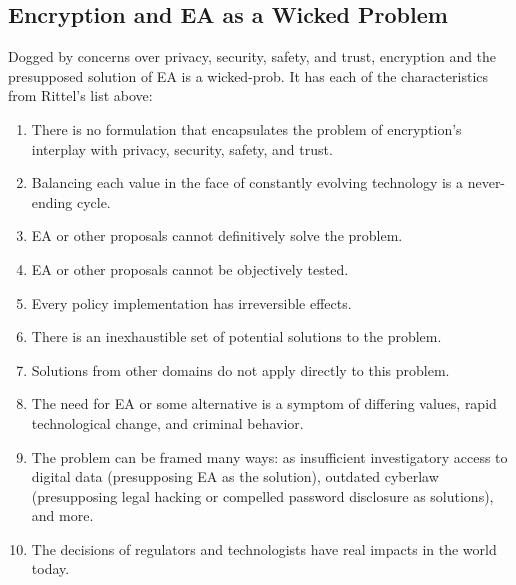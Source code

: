 
\subsection{Encryption and EA as a Wicked Problem}

Dogged by concerns over privacy, security, safety, and trust, \ac{encryption} and the presupposed solution of \ac{EA} is
a \ac{wicked-prob}. It has each of the characteristics from Rittel's list above:

\begin{enumerate}
  \item There is no formulation that encapsulates the problem of encryption's interplay with privacy, security,
        safety, and trust.
  \item Balancing each value in the face of constantly evolving technology is a never-ending cycle.
  \item \ac{EA} or other proposals cannot definitively solve the problem.
  \item \ac{EA} or other proposals cannot be objectively tested.
  \item Every policy implementation has irreversible effects.
  \item There is an inexhaustible set of potential solutions to the problem.
  \item Solutions from other domains do not apply directly to this problem.
  \item The need for \ac{EA} or some alternative is a symptom of differing values, rapid technological change, and
        criminal behavior.
  \item The problem can be framed many ways: as insufficient investigatory access to digital data (presupposing \ac{EA}
        as the solution), outdated cyberlaw (presupposing legal hacking or compelled password disclosure as solutions),
        and more.
  \item The decisions of regulators and technologists have real impacts in the world today.
\end{enumerate}

